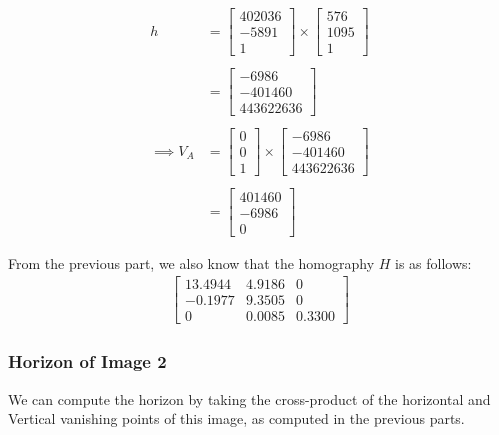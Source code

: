\documentclass[12pt, oneside]{article}
\begin{document}
\begin{align*}
h   &=  \begin{bmatrix} 402036  \\ -5891 \\ 1  \end{bmatrix} \times 
        \begin{bmatrix} 576   \\ 1095   \\   1   \end{bmatrix} \\ \\
    &=  \begin{bmatrix} -6986   \\ -401460   \\ 443622636   \end{bmatrix}  \\ \\   
\implies V_A  &=  \begin{bmatrix} 0   \\ 0   \\ 1   \end{bmatrix} \times  
        \begin{bmatrix} -6986   \\ -401460   \\ 443622636 \end{bmatrix} \\ \\
    &=  \begin{bmatrix} 401460   \\ -6986   \\ 0   \end{bmatrix} 
\end{align*}

From the previous part, we also know that the homography $H$ is as follows:
\begin{align*}
\begin{bmatrix}
    13.4944     &  4.9186   & 0 \\
    -0.1977     &  9.3505   & 0 \\
    0           & 0.0085  & 0.3300
\end{bmatrix}
\end{align*}

\subsubsection*{Horizon of Image 2} 

We can compute the horizon by taking the cross-product of the horizontal and Vertical
vanishing points of this image, as computed in the previous parts.
\end{document}
